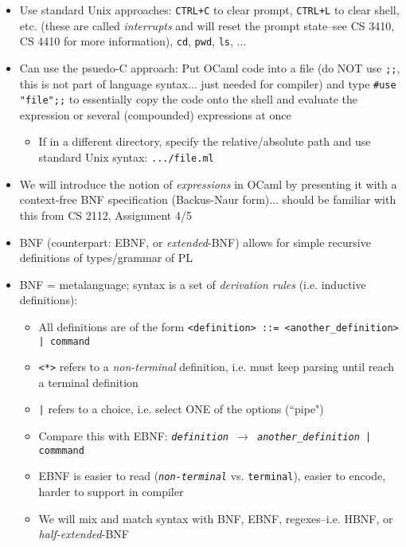 \begin{itemize}
\begin{itemize}
    \end{itemize}
    \item Use standard Unix approaches: \texttt{CTRL+C} to clear prompt, \texttt{CTRL+L} to clear shell, etc. (these are called \textit{interrupts} and will reset the prompt state--see CS 3410, CS 4410 for more information), \texttt{cd}, \texttt{pwd}, \texttt{ls}, $\ldots$
    \item Can use the psuedo-\textsf{C} approach: Put \textsf{OCaml} code into a file (do NOT use \texttt{;;}, this is not part of language syntax$\ldots$ just needed for compiler) and type \texttt{\#use "file";;} to essentially copy the code onto the shell and evaluate the expression or several (compounded) expressions at once
    \begin{itemize}
        \item If in a different directory, specify the relative/absolute path and use standard Unix syntax: \texttt{.../file.ml}
    \end{itemize}
    \item We will introduce the notion of \textit{expressions} in \textsf{OCaml} by presenting it with a context-free BNF specification (Backus-Naur form)$\ldots$ should be familiar with this from CS 2112, Assignment 4/5
    \item BNF (counterpart: EBNF, or \textit{extended}-BNF) allows for simple recursive definitions of types/grammar of PL
    \item BNF = metalanguage; syntax is a set of \textit{derivation rules} (i.e. inductive definitions):
    \begin{itemize}
        \item All definitions are of the form \texttt{<definition> ::= <another\_definition> | command}
        \item \texttt{<*>} refers to a \textit{non-terminal} definition, i.e. must keep parsing until reach a terminal definition
        \item \texttt{|} refers to a choice, i.e. select ONE of the options (``pipe")
        \item Compare this with EBNF: \texttt{\textit{definition} $\rightarrow$ \textit{another\_definition} | commmand}
        \item EBNF is easier to read (\texttt{\textit{non-terminal}} vs. \texttt{terminal}), easier to encode, harder to support in compiler
        \item We will mix and match syntax with BNF, EBNF, regexes--i.e. HBNF, or \textit{half-extended}-BNF
    \end{itemize}

\end{itemize}
